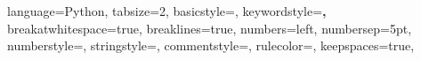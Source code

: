 \documentclass[a4paper, 12pt, twoside]{book}
\begin{document}
%



\lstset
{
language=Python, 
tabsize=2,  
basicstyle=\footnotesize, 
keywordstyle=\textbf,
breakatwhitespace=true,         %
breaklines=true,                 %
numbers=left,                    %
numbersep=5pt,                   %
numberstyle=\tiny\color{mygray}, %
stringstyle=\color{mymauve},
commentstyle=\color{mygreen},
rulecolor=\color{black},
keepspaces=true,                 %
}



\thispagestyle{empty}
\end{document}
